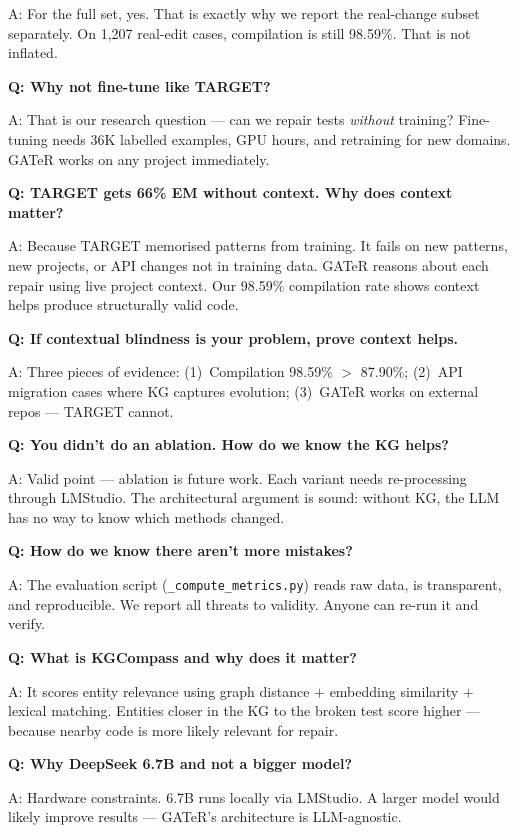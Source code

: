 \documentclass[11pt,a4paper]{article}
\begin{document}
A: For the full set, yes.  That is exactly why we report the
real-change subset separately.  On 1,207 real-edit cases, compilation
is still 98.59\%.  That is not inflated.

\textbf{Q: Why not fine-tune like TARGET?}

A: That is our research question --- can we repair tests \textit{without}
training?  Fine-tuning needs 36K labelled examples, GPU hours, and
retraining for new domains.  GATeR works on any project immediately.

\textbf{Q: TARGET gets 66\% EM without context.  Why does context matter?}

A: Because TARGET memorised patterns from training.  It fails on new
patterns, new projects, or API changes not in training data.  GATeR
reasons about each repair using live project context.  Our 98.59\%
compilation rate shows context helps produce structurally valid code.

\textbf{Q: If contextual blindness is your problem, prove context helps.}

A: Three pieces of evidence:
(1)~Compilation 98.59\% $>$ 87.90\%;
(2)~API migration cases where KG captures evolution;
(3)~GATeR works on external repos --- TARGET cannot.

\textbf{Q: You didn't do an ablation.  How do we know the KG helps?}

A: Valid point --- ablation is future work.  Each variant needs
re-processing through LMStudio.  The architectural argument is
sound: without KG, the LLM has no way to know which methods changed.

\textbf{Q: How do we know there aren't more mistakes?}

A: The evaluation script (\texttt{\_compute\_metrics.py}) reads raw
data, is transparent, and reproducible.  We report all threats to
validity.  Anyone can re-run it and verify.

\textbf{Q: What is KGCompass and why does it matter?}

A: It scores entity relevance using graph distance $+$ embedding
similarity $+$ lexical matching.  Entities closer in the KG to the
broken test score higher --- because nearby code is more likely
relevant for repair.

\textbf{Q: Why DeepSeek 6.7B and not a bigger model?}

A: Hardware constraints.  6.7B runs locally via LMStudio.  A larger
model would likely improve results --- GATeR's architecture is
LLM-agnostic.
\end{document}
